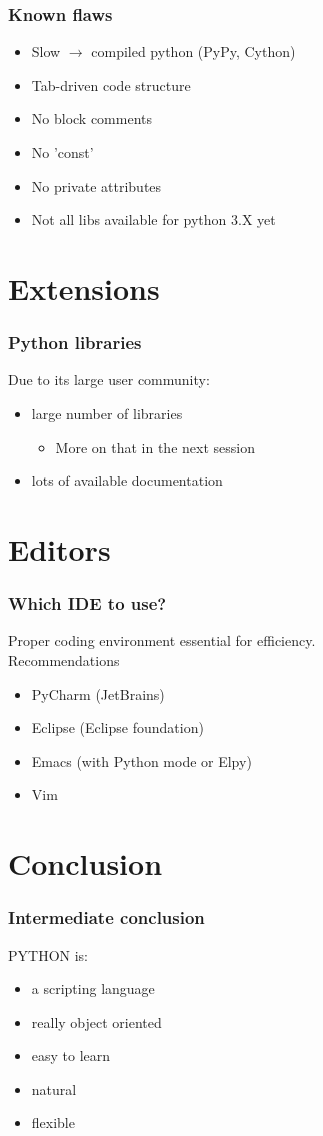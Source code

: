 \documentclass[14pt]{beamer}
\begin{document}
\begin{frame}
\frametitle{Known flaws}
\begin{itemize}
\item Slow $\rightarrow$ compiled python (PyPy, Cython)
\item Tab-driven code structure
\item No block comments
\item No 'const'
\item No private attributes
\item Not all libs available for python 3.X yet
\end{itemize}
\end{frame}

\section{Extensions}

\begin{frame}
\frametitle{Python libraries}
Due to its large user community:
\begin{itemize}
\item large number of libraries
\begin{itemize}
\item More on that in the next session
\end{itemize}
\item lots of available documentation
\end{itemize}
\end{frame}

\section{Editors}
\begin{frame}
\frametitle{Which IDE to use?}
\alert{Proper coding environment essential for efficiency.}\\
Recommendations
\begin{itemize}
\item PyCharm (JetBrains)
\item Eclipse (Eclipse foundation)
\item Emacs (with Python mode or Elpy)
\item Vim
\end{itemize}
\end{frame}

\section{Conclusion}

\begin{frame}
\frametitle{Intermediate conclusion}
PYTHON is:
\begin{itemize}
\item a scripting language
\item really object oriented
\item easy to learn
\item natural
\item flexible
\end{itemize}
\end{frame}
\end{document}
